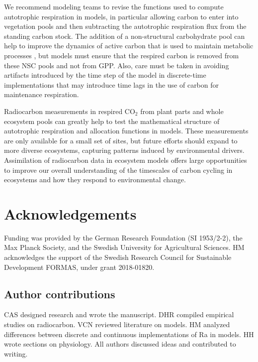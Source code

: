 \documentclass[12pt, a4paper]{article}
\begin{document}
We recommend modeling teams to revise the functions used to compute autotrophic respiration in models, in particular allowing carbon to enter into vegetation pools and then subtracting the autotrophic respiration flux from the standing carbon stock. The addition of a non-structural carbohydrate pool can help to improve the dynamics of active carbon that is used to maintain metabolic processes \citep{Herrera2020}, but models must ensure that the respired carbon is removed from these NSC pools and not from GPP. Also,
care must be taken in avoiding artifacts introduced by the time step of the model in discrete-time implementations that may introduce time lags in the use of carbon for maintenance respiration. 

Radiocarbon measurements in respired CO$_2$ from plant parts and whole ecosystem pools can greatly help to test the mathematical structure of autotrophic respiration and allocation functions in models. These measurements are only available for a small set of sites, but future efforts should expand to more diverse ecosystems, capturing patterns induced by environmental drivers.  Assimilation of radiocarbon data in ecosystem models offers large opportunities to improve our overall understanding of the timescales of carbon cycling in ecosystems and how they respond to environmental change. 


\section*{Acknowledgements}
Funding was provided by the German Research Foundation (SI 1953/2-2), the Max Planck Society, and the Swedish University for Agricultural Sciences. HM acknowledges the support of the Swedish Research Council for Sustainable Development FORMAS, under grant 2018-01820.

\subsection*{Author contributions}
CAS designed research and wrote the manuscript. DHR compiled empirical studies on radiocarbon. VCN reviewed literature on models. HM analyzed differences between discrete and continuous implementations of Ra in models. HH wrote sections on physiology. All authors discussed ideas and contributed to writing.
\end{document}
